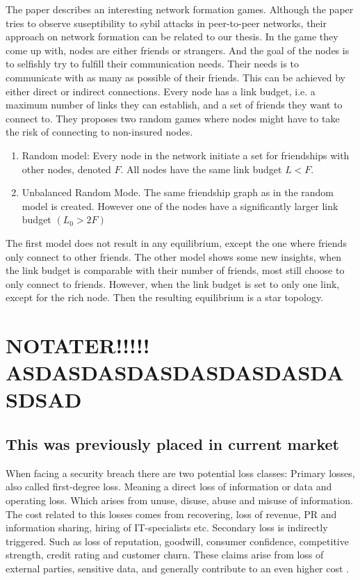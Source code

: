 The paper \cite{danezis2006network} describes an interesting network formation games. Although the paper tries to observe suseptibility to sybil attacks in peer-to-peer networks, their approach on network formation can be related to our thesis. In the game they come up with, nodes are either friends or strangers. And the goal of the nodes is to selfishly try to fulfill their communication needs. Their needs is to communicate with as many as possible of their friends. This can be achieved by either direct or indirect connections. Every node has a link budget, i.e. a maximum number of links they can establish, and a set of friends they want to connect to. 
They proposes two random games where nodes might have to take the risk of connecting to non-insured nodes.
\begin{enumerate}
\item Random model: Every node in the network initiate a set for friendships with other nodes, denoted $F$. All nodes have the same link budget $L<F$. 
\item Unbalanced Random Mode. The same friendship graph as in the random model is created. However one of the nodes have a significantly larger link budget $(L_{0} > 2 F)$
\end{enumerate}
The first model does not result in any equilibrium, except the one where friends only connect to other friends.
The other model shows some new insights, when the link budget is comparable with their number of friends, most still choose to only connect to friends. However, when the link budget is set to only one link, except for the rich node. Then the resulting equilibrium is a star topology. 



\section{NOTATER!!!!! ASDASDASDASDASDASDASDASDSAD}
\subsection{This was previously placed in current market }
When facing a security breach there are two potential loss classes:
Primary losses, also called first-degree loss. Meaning a direct loss of information or data and operating loss. 
Which arises from unuse, disuse, abuse and misuse of information.
 The cost related to this losses comes from recovering, loss of revenue, 
 PR and information sharing, hiring of IT-specialists etc. 
Secondary loss is indirectly triggered. Such as loss of reputation, goodwill, 
consumer confidence, competitive strength, credit rating and customer churn. 
These claims arise from loss of external parties, sensitive data, 
and generally contribute to an even higher cost \cite{bandyopadhyay2009managers}.

